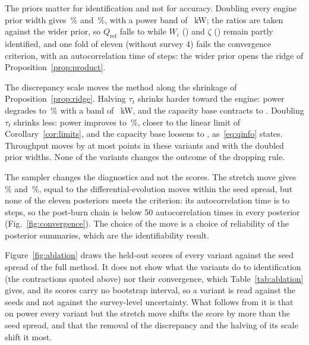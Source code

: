 \documentclass[journal]{IEEEtran}
\newcommand{\pct}{\,\%}
\begin{document}
The priors matter for identification and not for accuracy. Doubling every engine prior width gives \abWideTphMape\pct{} and
\abWideKwMape\pct, with a power band of \abWideKwWidth~kW; the ratios are taken against the wider prior, so
$Q_{\mathrm{ref}}$ falls to \abWideQRefContr{} while $W_i$ (\abWideWiContr) and $\zeta$ (\abWideZetaContr) remain partly
identified, and one fold of eleven (without survey 4) fails the convergence criterion, with an autocorrelation time of
\abWideTauMax{} steps: the wider prior opens the ridge of Proposition~\ref{prop:product}.

The discrepancy scale moves the method along the shrinkage of Proposition~\ref{prop:ridge}. Halving $\tau_t$ shrinks harder
toward the engine: power degrades to \abTauHalfKwMape\pct{} with a band of \abTauHalfKwWidth~kW, and the capacity base
contracts to \abTauHalfQRefContr. Doubling $\tau_t$ shrinks less: power improves to \abTauDoubleKwMape\pct, closer to the
linear limit of Corollary~\ref{cor:limits}, and the capacity base loosens to \abTauDoubleQRefContr, as~\eqref{eq:qinfo} states.
Throughput moves by at most \priorShiftMaxTph{} points in these variants and with the doubled prior widths. None of the variants changes the outcome of the dropping
rule.

The sampler changes the diagnostics and not the scores. The stretch move gives \abStretchTphMape\pct{} and
\abStretchKwMape\pct, equal to the differential-evolution moves within the seed spread, but none of the eleven posteriors
meets the criterion: its autocorrelation time is \abStretchTauMin{} to \abStretchTauMax{} steps, so the post-burn chain is
below 50 autocorrelation times in every posterior (Fig.~\ref{fig:convergence}). The choice of the move is a choice of
reliability of the posterior summaries, which are the identifiability result.

Figure~\ref{fig:ablation} draws the held-out scores of every variant against the seed spread of the full method. It does not
show what the variants do to identification (the contractions quoted above) nor their convergence, which
Table~\ref{tab:ablation} gives, and its scores carry no bootstrap interval, so a variant is read against the seeds and not
against the survey-level uncertainty. What follows from it is that on power every variant but the stretch move shifts the
score by more than the seed spread, and that the removal of the discrepancy and the halving of its scale shift it most.

\begin{table}[!t]
\caption{Ablation of CrusherBayes on the ten HP500 surveys: every row reruns the eleven posteriors of the strict leave-one-survey-out protocol with one component changed, and gives the held-out MAPE, coverage and mean width of each output, the range of the largest autocorrelation time and the converged posteriors.}
\label{tab:ablation}
\centering\footnotesize
\resizebox{\textwidth}{!}{}
\end{table}
\end{document}
